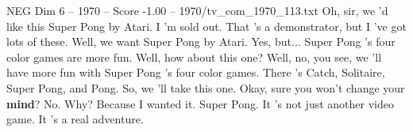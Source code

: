 \begin{textsample}{NEG Dim 6 – 1970 – Score -1.00 – 1970/tv\_com\_1970\_113.txt}  \label{ex:f6_neg_068}
Oh, sir, we 'd like this Super Pong by Atari.
I 'm sold out.
That 's a demonstrator, but I 've got lots of these.
Well, we want Super Pong by Atari.
Yes, but...
Super Pong 's four color games are more fun.
Well, how about this one?
Well, no, you see, we 'll have more fun with Super Pong 's four color games.
There 's Catch, Solitaire, Super Pong, and Pong.
So, we 'll take this one.
Okay, sure you won't change your \textbf{mind}?
No.
Why?
Because I wanted it.
Super Pong.
It 's not just another video game.
It 's a real adventure.

\end{textsample}
